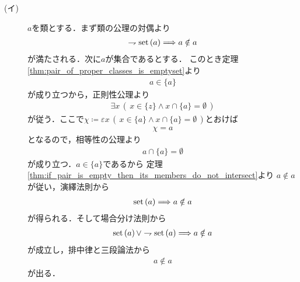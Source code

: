 	\begin{prf}\mbox{}
		\begin{description}
			\item[(イ)] $a$を類とする．まず類の公理の対偶より
				\begin{align}
					\rightharpoondown \operatorname*{set} \left(a\right) \Longrightarrow a \notin a
				\end{align}
				が満たされる．次に$a$が集合であるとする．
				このとき定理\ref{thm:pair_of_proper_classes_is_emptyset}より
				\begin{align}
					a \in \{a\}
				\end{align}
				が成り立つから，正則性公理より
				\begin{align}
					\exists x\, \left(\, x \in \{z\} \wedge x \cap \{a\} = \emptyset\, \right)
				\end{align}
				が従う．ここで$\chi \coloneqq \varepsilon x\, \left(\, x \in \{a\} \wedge x \cap \{a\} = \emptyset\, \right)$とおけば
				\begin{align}
					\chi = a
				\end{align}
				となるので，相等性の公理より
				\begin{align}
					a \cap \{a\} = \emptyset
				\end{align}
				が成り立つ．$a \in \{a\}$であるから
				定理\ref{thm:if_pair_is_empty_then_its_members_do_not_intersect}より
				$a \notin a$が従い，演繹法則から
				\begin{align}
					\operatorname*{set} \left(a\right) \Longrightarrow a \notin a
				\end{align}
				が得られる．そして場合分け法則から
				\begin{align}
					\operatorname*{set} \left(a\right) \vee \rightharpoondown \operatorname*{set} \left(a\right) \Longrightarrow a \notin a
				\end{align}
				が成立し，排中律と三段論法から
				\begin{align}
					a \notin a
				\end{align}
				が出る．
			

\end{description}
\end{prf}

